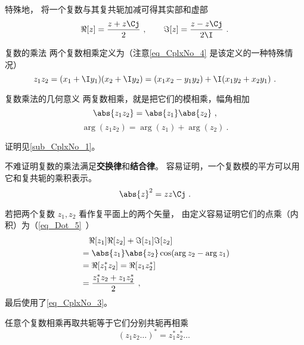 特殊地， 将一个复数与其复共轭加减可得其实部和虚部
\begin{equation}\label{eq_CplxNo_3}
\Re[z] = \frac{z + z\Cj}{2} ~,\qquad
\Im[z] = \frac{z - z\Cj}{2\I}~.
\end{equation}

\begin{definition}{复数的乘法}
两个复数相乘定义为（注意\autoref{eq_CplxNo_4} 是该定义的一种特殊情况）
\begin{equation}
z_1z_2 = (x_1 + \I y_1)(x_2 + \I y_2) = (x_1 x_2 - y_1 y_2) + \I (x_1 y_2 + x_2 y_1)~.
\end{equation}
\end{definition}

\begin{theorem}{复数乘法的几何意义}\label{the_CplxNo_2}
两复数相乘，就是把它们的模相乘，幅角相加
\begin{equation}\label{eq_CplxNo_10}
\abs{z_1 z_2} = \abs{z_1}\abs{z_2}~,
\end{equation}
\begin{equation}
\arg(z_1 z_2) = \arg(z_1) + \arg(z_2)~.
\end{equation}
\end{theorem}
证明见\autoref{sub_CplxNo_1}。

不难证明复数的乘法满足\textbf{交换律}和\textbf{结合律}。 容易证明，一个复数模的平方可以用它和复共轭的乘积表示。
\begin{equation}\label{eq_CplxNo_2}
\abs{z}^2 = z z\Cj~.
\end{equation}

若把两个复数 $z_1, z_2$ 看作复平面上的两个矢量， 由定义容易证明它们的点乘（内积）为（\autoref{eq_Dot_5}~）
\begin{equation}\label{eq_CplxNo_11}
\begin{aligned}
&\quad \Re[z_1] \Re[z_2] + \Im[z_1]\Im[z_2]\\
&= \abs{z_1}\abs{z_2}\cos(\arg z_2 - \arg z_1)\\
&= \Re[z_1^* z_2] = \Re[z_1 z_2^*]\\
&= \frac{z_1^* z_2 + z_1 z_2^*}{2}~,
\end{aligned}
\end{equation}
最后使用了\autoref{eq_CplxNo_3}。

任意个复数相乘再取共轭等于它们分别共轭再相乘
\begin{equation}
(z_1z_2\dots)^* = z_1^*z_2^*\dots~
\end{equation}


